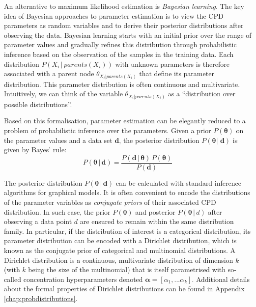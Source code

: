 An alternative to maximum likelihood estimation is \textit{Bayesian learning}.  The key idea of Bayesian approaches to parameter estimation is to view the CPD parameters as random variables and to derive their posterior distributions after observing the data.  Bayesian learning starts with an initial prior over the range of parameter values and gradually refines this distribution through probabilistic inference based on the observation of the samples in the training data. Each distribution $P(X_i \, | \, parents(X_i))$ with unknown parameters is therefore associated with a parent node $\theta_{X_i|parents(X_i)}$ that define its parameter distribution.  This parameter distribution is often continuous and multivariate.  Intuitively, we can think of the variable $\theta_{X_i|parents(X_i)}$ as  a ``distribution over possible distributions''.  

Based on this formalisation, parameter estimation can be elegantly reduced to a problem of probabilistic inference over the parameters. Given a prior $P(\boldsymbol\theta)$ on the parameter values and a data set $\mathbf{d}$, the posterior distribution $P(\boldsymbol\theta  \, | \, \mathbf{d})$ is given by Bayes' rule: 
\begin{equation}
P(\boldsymbol\theta  \, | \, \mathbf{d}) =  \frac{P(\mathbf{d} \, | \, \boldsymbol\theta) \, P(\boldsymbol\theta)}{P(\mathbf{d})}
\end{equation}


The posterior distribution $P(\boldsymbol\theta  \, | \, \mathbf{d})$ can be calculated with standard inference algorithms for graphical models. It is often convenient to encode the distributions of the parameter variables as \textit{conjugate priors} of their associated CPD distribution. In such case, the prior $P(\boldsymbol\theta)$ and posterior $P(\boldsymbol\theta  \, | \, d)$ after observing a data point $d$ are ensured to remain within the same distribution family. In particular, if the distribution of interest is a categorical distribution, its parameter distribution can be encoded with a Dirichlet distribution, which is known as the conjugate prior of categorical and multinomial distributions. A Dirichlet distribution is a continuous, multivariate distribution of dimension $k$ (with $k$ being the size of the multinomial) that is itself parametrised with so-called concentration hyperparameters denoted $\boldsymbol\alpha = [ \alpha_1,... \alpha_k ]$. Additional details about the formal properties of Dirichlet distributions can be found in Appendix \ref{chap:probdistributions}.

